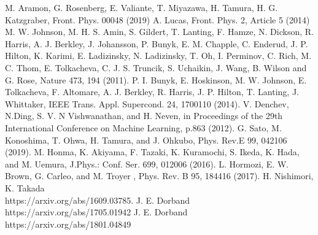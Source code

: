 \documentclass{jarticle}
\begin{document}
\begin{thebibliography}{99}


  
  M. Aramon, G. Rosenberg, E. Valiante, T. Miyazawa, H. Tamura, H. G. Katzgraber, Front. Phys. 00048 (2019)
  A. Lucas, Front. Phys. 2, Article 5 (2014)
  M. W. Johnson, M. H. S. Amin, S. Gildert, T. Lanting, F. Hamze, N. Dickson, R. Harris, A. J. Berkley, J. Johansson, P. Bunyk, E. M. Chapple, C. Enderud, J. P. Hilton, K. Karimi, E. Ladizinsky, N. Ladizinsky, T. Oh, I. Perminov, C. Rich, M. C. Thom, E. Tolkacheva, C. J. S. Truncik, S. Uchaikin, J. Wang, B. Wilson and G. Rose, Nature 473, 194 (2011).
  P. I. Bunyk, E. Hoskinson, M. W. Johnson, E. Tolkacheva, F. Altomare, A. J. Berkley, R. Harris, J. P. Hilton, T. Lanting, J. Whittaker, IEEE Trans. Appl. Supercond. 24, 1700110 (2014).
  V. Denchev, N.Ding, S. V. N Vishwanathan, and H. Neven, in Proceedings of the 29th International Conference on Machine Learning, p.863 (2012).
  G. Sato, M. Konoshima, T. Ohwa, H. Tamura, and J. Ohkubo, Phys. Rev.E 99, 042106 (2019).
  M. Honma, K. Akiyama, F. Tazaki, K. Kuramochi, S. Ikeda, K. Hada,
  and M. Uemura, J.Phys.: Conf. Ser. 699, 012006 (2016).
  L. Hormozi, E. W. Brown, G. Carleo, and M. Troyer , Phys. Rev. B 95, 184416 (2017).
  H. Nishimori, K. Takada \\
  https://arxiv.org/abs/1609.03785.
  J. E. Dorband \\
  https://arxiv.org/abs/1705.01942
  J. E. Dorband \\
  https://arxiv.org/abs/1801.04849
\end{thebibliography}
\end{document}
